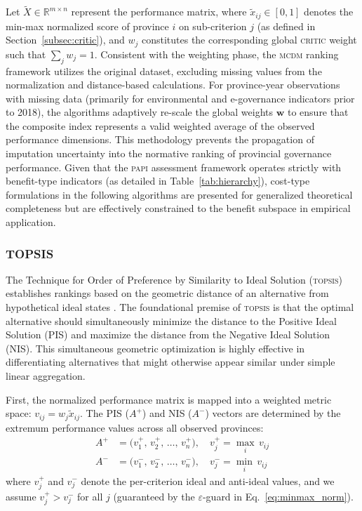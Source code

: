 \documentclass[12pt,a4paper]{article}
\newcommand{\PAPI}{\textsc{papi}\xspace}
\newcommand{\MCDM}{\textsc{mcdm}\xspace}
\newcommand{\CRITIC}{\textsc{critic}\xspace}
\newcommand{\TOPSIS}{\textsc{topsis}\xspace}
\begin{document}
Let \( \tilde{X} \in \mathbb{R}^{m \times n} \) represent the performance matrix, where \( \tilde{x}_{ij} \in [0, 1] \) denotes the min-max normalized score of province \( i \) on sub-criterion \( j \) (as defined in Section~\ref{subsec:critic}), and \( w_j \) constitutes the corresponding global \CRITIC weight such that \( \sum_j w_j = 1 \). Consistent with the weighting phase, the \MCDM ranking framework utilizes the original dataset, excluding missing values from the normalization and distance-based calculations. For province-year observations with missing data (primarily for environmental and e-governance indicators prior to 2018), the algorithms adaptively re-scale the global weights $\mathbf{w}$ to ensure that the composite index represents a valid weighted average of the observed performance dimensions. This methodology prevents the propagation of imputation uncertainty into the normative ranking of provincial governance performance. Given that the \PAPI assessment framework operates strictly with benefit-type indicators (as detailed in Table~\ref{tab:hierarchy}), cost-type formulations in the following algorithms are presented for generalized theoretical completeness but are effectively constrained to the benefit subspace in empirical application.

\subsubsection{TOPSIS}
\label{subsubsec:topsis}
The Technique for Order of Preference by Similarity to Ideal Solution (\TOPSIS) establishes rankings based on the geometric distance of an alternative from hypothetical ideal states \citep{Hwang1981}. The foundational premise of \TOPSIS is that the optimal alternative should simultaneously minimize the distance to the Positive Ideal Solution (PIS) and maximize the distance from the Negative Ideal Solution (NIS). This simultaneous geometric optimization is highly effective in differentiating alternatives that might otherwise appear similar under simple linear aggregation.

First, the normalized performance matrix is mapped into a weighted metric space: \( v_{ij} = w_j \tilde{x}_{ij} \). The PIS (\( A^+ \)) and NIS (\( A^- \)) vectors are determined by the extremum performance values across all observed provinces:
\begin{align}
    A^+ &= \bigl(v_1^+,\, v_2^+,\, \ldots,\, v_n^+\bigr), \quad v_j^+ = \max_{i}\, v_{ij} \label{eq:pis}\\
    A^- &= \bigl(v_1^-,\, v_2^-,\, \ldots,\, v_n^-\bigr), \quad v_j^- = \min_{i}\, v_{ij} \label{eq:nis}
\end{align}
where $v_j^+$ and $v_j^-$ denote the per-criterion ideal and anti-ideal values, and we assume $v_j^+ > v_j^-$ for all $j$ (guaranteed by the $\varepsilon$-guard in Eq.~\eqref{eq:minmax_norm}).
\end{document}
